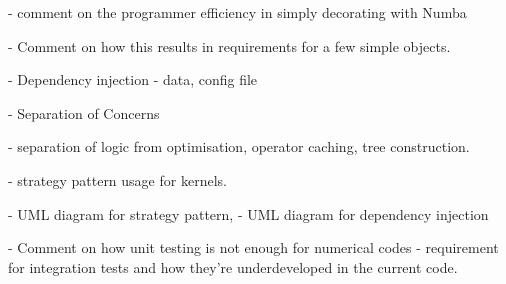 - comment on the programmer efficiency in simply decorating with Numba

- Comment on how this results in requirements for a few simple objects.

- Dependency injection
    - data, config file

- Separation of Concerns

   - separation of logic from optimisation, operator caching,
       tree construction.

    - strategy pattern usage for kernels.

- UML diagram for strategy pattern,
- UML diagram for dependency injection

- Comment on how unit testing is not enough for numerical codes
    - requirement for integration tests and how they're underdeveloped in
    the current code.

